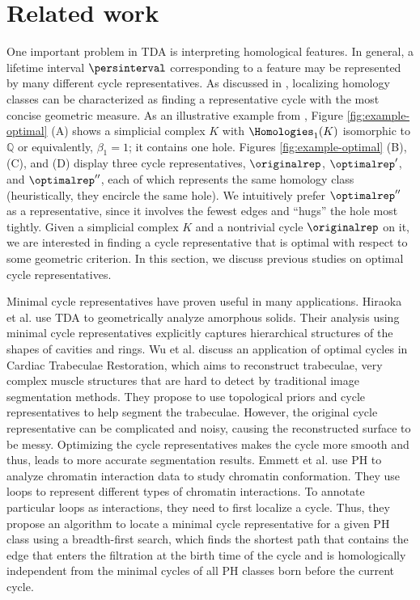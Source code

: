 \section{Related work}\label{problem formulation}


One important problem in TDA is interpreting homological features. In general, a lifetime interval $\persinterval$ corresponding to a feature may be represented by many different cycle representatives. As discussed in \cite{chenquantifying}, localizing homology classes can be characterized as finding a representative cycle with the most concise geometric measure. As an illustrative example from \cite{Escolar2016}, Figure \ref{fig:example-optimal} (A) shows a simplicial complex $K$ with $\Homologies_1(K)$ isomorphic to $\mathbb{Q}$ or equivalently, $\beta_1=1$; it contains one hole.  Figures \ref{fig:example-optimal} (B), (C), and (D) display three cycle representatives, $\originalrep$, $\optimalrep'$, and $\optimalrep''$, each of which represents the same homology class (heuristically, they encircle the same hole). We intuitively prefer $\optimalrep''$ as a representative, since it involves the fewest edges %
and ``hugs'' the hole most tightly. Given a simplicial complex $K$ and a nontrivial cycle $\originalrep$ on it, we are interested in finding a cycle representative that is optimal with respect to some geometric criterion. In this section, we discuss previous studies on optimal cycle representatives. 

Minimal cycle representatives have proven  useful in many applications. Hiraoka et al. \cite{Hiraoka7035} use TDA to geometrically analyze amorphous solids. Their analysis using minimal cycle representatives explicitly captures hierarchical structures of the shapes of cavities and rings. Wu et al. \cite{wu} discuss an application of optimal cycles in Cardiac Trabeculae Restoration, which aims to reconstruct trabeculae, very complex muscle structures that are hard to detect by traditional image segmentation methods. They propose to use topological priors and cycle representatives to help segment the trabeculae. However, the original cycle representative can be complicated and noisy, causing the reconstructed surface to be messy. Optimizing the cycle representatives makes the cycle more smooth and thus, leads to more accurate segmentation results. Emmett et al. \cite{emmett2015multiscale} use PH to analyze chromatin interaction data to study chromatin conformation. They use loops to represent different types of chromatin interactions. To annotate particular loops as interactions, they need to first localize a cycle. Thus, they propose an algorithm to locate a minimal cycle representative for a given PH class using a breadth-first search, which finds the shortest path that contains the edge that enters the filtration at the birth time of the cycle and is homologically independent from the minimal cycles of all PH classes born before the current cycle. 

